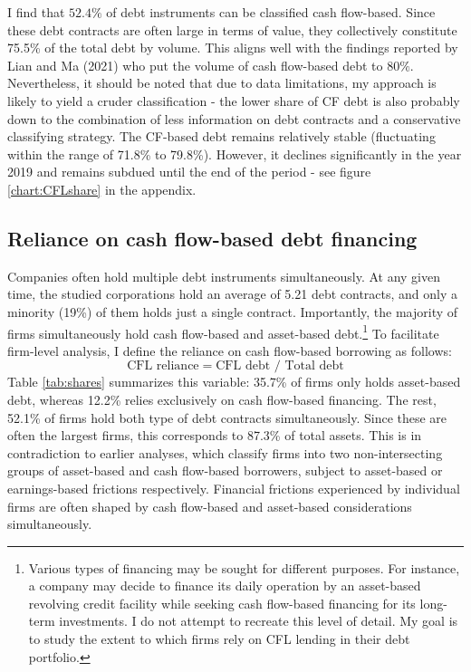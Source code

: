 \documentclass[12pt]{article}
\begin{document}
I find that $52.4\%$ of debt instruments can be classified cash flow-based. Since these debt contracts are often large in terms of value, they collectively constitute 75.5\% of the total debt by volume. This aligns well with the findings reported by Lian and Ma (2021) who put the volume of cash flow-based debt to $80\%$. Nevertheless, it should be noted that due to data limitations, my approach is likely to yield a cruder classification - the lower share of CF debt is also probably down to the combination of less information on debt contracts and a conservative classifying strategy. The CF-based debt remains relatively stable (fluctuating within the range of 71.8\% to 79.8\%). However, it declines significantly in the year 2019 and remains subdued until the end of the period - see figure \ref{chart:CFLshare} in the appendix. 

\subsection{Reliance on cash flow-based debt financing \label{sec:CFL reliance}}
Companies often hold multiple debt instruments simultaneously. At any given time, the studied corporations hold an average of 5.21 debt contracts, and only a minority (19\%) of them holds just a single contract. Importantly, the majority of firms simultaneously hold cash flow-based and asset-based debt.\footnote{Various types of financing may be sought for different purposes. For instance, a company may decide to finance its daily operation by an asset-based revolving credit facility while seeking cash flow-based financing for its long-term investments. I do not attempt to recreate this level of detail. My goal is to study the extent to which firms rely on CFL lending in their debt portfolio.}  To facilitate firm-level analysis, I define the reliance on cash flow-based borrowing as follows: 
$$ \text{CFL reliance}  = \text{CFL debt } / \text{ Total debt} $$
Table \ref{tab:shares} summarizes this variable: 35.7\% of firms only holds asset-based debt, whereas 12.2\% relies exclusively on cash flow-based financing. The rest, 52.1\% of firms hold both type of debt contracts simultaneously. Since these are often the largest firms, this corresponds to 87.3\% of total assets. This is in contradiction to earlier analyses, which classify firms into two non-intersecting groups of asset-based and cash flow-based borrowers, subject to asset-based or earnings-based frictions respectively. Financial frictions experienced by individual firms are often shaped by cash flow-based and asset-based considerations simultaneously. 
 
\end{document}
